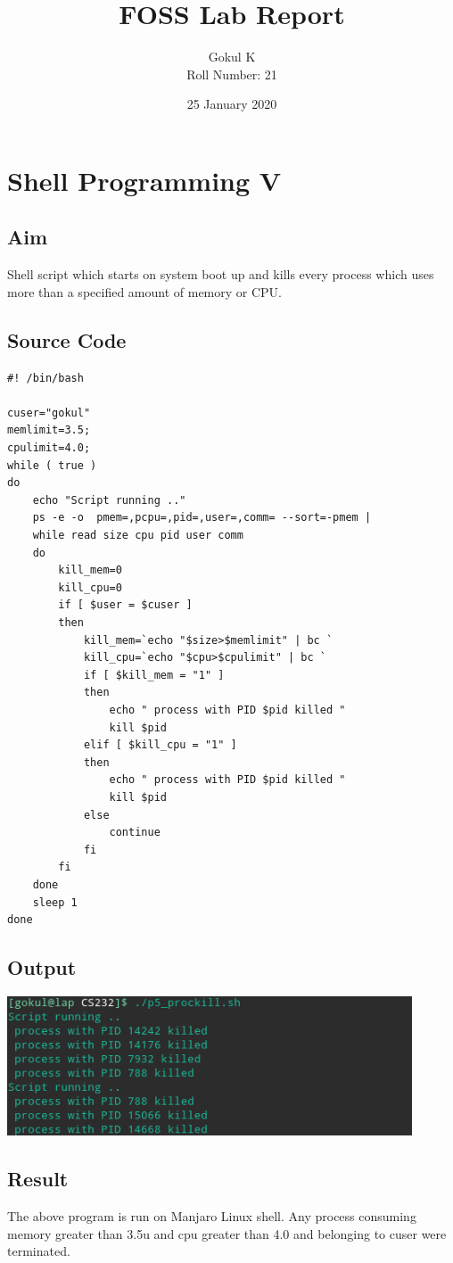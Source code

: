 \documentclass{article}
\begin{document}
\title{FOSS Lab Report}
\author{Gokul K\\[2\baselineskip]
Roll Number: 21\\[2\baselineskip]}
\date{25 January 2020}

\maketitle

\setcounter{section}{8}
\section{Shell Programming V}
\subsection{Aim}
Shell script which starts on system boot up and kills every process which uses more
than a specified amount of memory or CPU.

\subsection{Source Code}
\begin{verbatim}
#! /bin/bash

cuser="gokul"
memlimit=3.5;
cpulimit=4.0;
while ( true )
do
    echo "Script running .."
    ps -e -o  pmem=,pcpu=,pid=,user=,comm= --sort=-pmem |
    while read size cpu pid user comm
    do
        kill_mem=0
        kill_cpu=0
        if [ $user = $cuser ]
        then
            kill_mem=`echo "$size>$memlimit" | bc `
            kill_cpu=`echo "$cpu>$cpulimit" | bc `
            if [ $kill_mem = "1" ]
            then
                echo " process with PID $pid killed "
                kill $pid
            elif [ $kill_cpu = "1" ]
            then
                echo " process with PID $pid killed "
                kill $pid
            else
                continue
            fi
        fi
    done
    sleep 1
done

\end{verbatim}

\subsection{Output}
\includegraphics[width=0.9\textwidth]{img/p9.png}\newline

\subsection{Result}
The above program is run on Manjaro Linux shell. Any process
consuming memory greater than 3.5u and cpu greater than 4.0 and
belonging to cuser were terminated.
\end{document}
